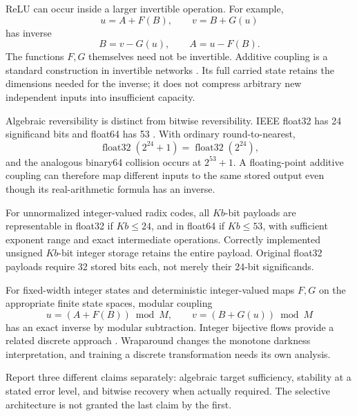ReLU can occur inside a larger invertible operation. For example,
\[
 u=A+F(B),\qquad v=B+G(u)
\]
has inverse
\[
 B=v-G(u),\qquad A=u-F(B).
\]
The functions \(F,G\) themselves need not be invertible. Additive coupling is
a standard construction in invertible networks \cite{nice}. Its full carried
state retains the dimensions needed for the inverse; it does not compress
arbitrary new independent inputs into insufficient capacity.

Algebraic reversibility is distinct from bitwise reversibility. IEEE float32
has 24 significand bits and float64 has 53 \cite{ieee}. With ordinary
round-to-nearest,
\[
 \operatorname{float32}(2^{24}+1)
 =\operatorname{float32}(2^{24}),
\]
and the analogous binary64 collision occurs at \(2^{53}+1\).
A floating-point additive coupling can therefore map different inputs to the
same stored output even though its real-arithmetic formula has an inverse.

For unnormalized integer-valued radix codes, all \(Kb\)-bit payloads are
representable in float32 if \(Kb\le24\), and in float64 if \(Kb\le53\),
with sufficient exponent range and exact intermediate operations.
Correctly implemented unsigned \(Kb\)-bit integer storage retains the entire
payload. Original float32 payloads require 32 stored bits each, not merely
their 24-bit significands.

For fixed-width integer states and deterministic integer-valued maps
\(F,G\) on the appropriate finite state spaces, modular coupling
\[
 u=(A+F(B))\bmod M,\qquad v=(B+G(u))\bmod M
\]
has an exact inverse by modular subtraction. Integer bijective flows provide
a related discrete approach \cite{idf}. Wraparound changes the monotone
darkness interpretation, and training a discrete transformation needs its own
analysis.

Report three different claims separately: algebraic target sufficiency,
stability at a stated error level, and bitwise recovery when actually required.
The selective architecture is not granted the last claim by the first.
